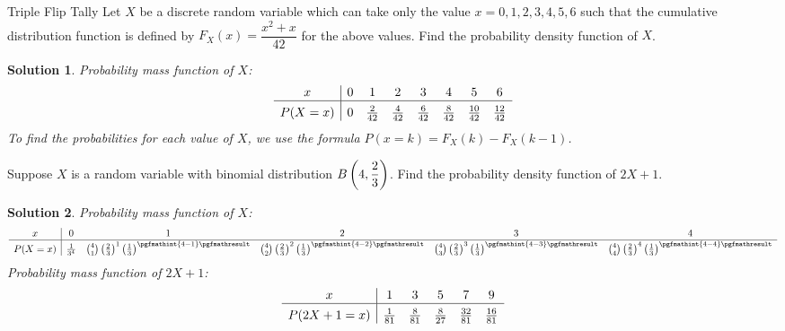 \documentclass[11pt]{article}
\newtheorem*{solution}{Solution}
\theoremstyle{mystyle}
\newcommand{\PPFour}[1]{\binom{4}{#1} \left( \frac{2}{3} \right)^{#1}\left(\frac{1}{3}\right)^{\pgfmathint{4-#1}\pgfmathresult}}
\begin{document}
\begin{psproblem}{Triple Flip Tally}{}
    Let $X$ be a discrete random variable which can take only the value $x = 0, 1, 2, 3, 4, 5, 6$ such that the cumulative
    distribution function is defined by $F_X(x) = \dfrac{x^2 + x}{42}$ for the above values. Find the probability density function of $X$.
\end{psproblem}

\begin{solution}
    Probability mass function of $X$: \[
    \begin{array}{c|ccccccc}
        x & 0 & 1 & 2 & 3 & 4 & 5 & 6 \\ \hline
        \rule{0pt}{12pt} %
        P(X = x) & 0 & \frac{2}{42} & \frac{4}{42} & \frac{6}{42} & \frac{8}{42} & \frac{10}{42} & \frac{12}{42}
    \end{array}
    \]
    To find the probabilities for each value of $X$, we use the formula $P(x=k)=F_X(k)-F_X(k-1)$.
\end{solution}

\begin{psproblem}{}{}
    Suppose $X$ is a random variable with binomial distribution $B \displaystyle \left( 4, \dfrac{2}{3} \displaystyle \right)$. Find the probability density function of
    $2X + 1$.
\end{psproblem}
\begin{solution}
    Probability mass function of $X$: \[
    \begin{array}{c|ccccc}
        x & 0 & 1 & 2 & 3 & 4 \\ \hline
        \rule{0pt}{12pt} %
        P(X = x) & \frac{1}{3^4} & \PPFour{1} & \PPFour{2} & \PPFour{3} & \PPFour{4}
    \end{array}
    \]
    Probability mass function of $2X + 1$: \[
    \begin{array}{c|ccccc}
        x & 1 & 3 & 5 & 7 & 9 \\ \hline
        \rule{0pt}{12pt} %
        P(2X + 1 = x) & \frac{1}{81} & \frac{8}{81} & \frac{8}{27} & \frac{32}{81} & \frac{16}{81}
    \end{array}
    \]
\end{solution}
\end{document}

